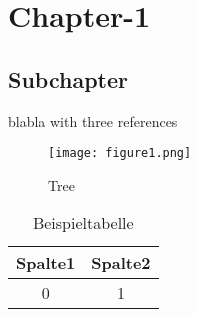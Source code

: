 
\section{Chapter-1}


\subsection{Subchapter}

blabla with three references\cite{ietf-ipfix-protocol,snoeren2001hash,belenky2003ip}

\begin{figure}[h]%
 	\begin{center}%
 		\texttt{[image: figure1.png]}%
 		\caption{Tree}\label{fig:baum}%
 	\end{center}%
\end{figure}

\begin{table}[h]%
 	\begin{center}%
		\caption{Beispieltabelle}\label{tab:example}%
	 	\begin{tabular}{c|c}%
 			Spalte1 & Spalte2\\
 			\hline
 			0 & 1\\
 		\end{tabular}%
 	\end{center}%
\end{table}
